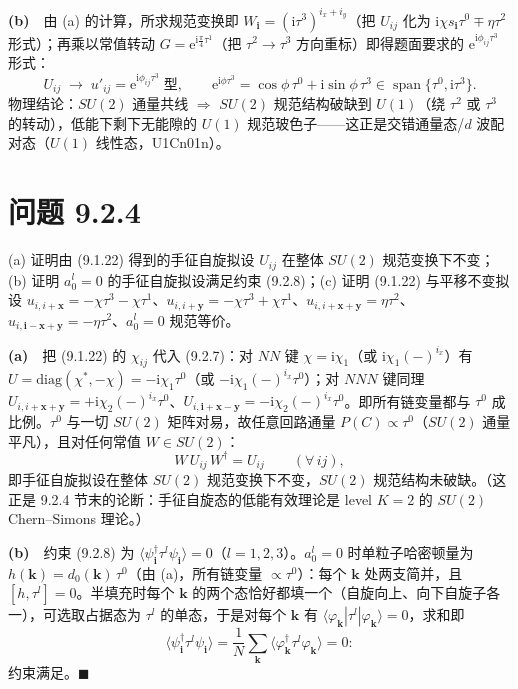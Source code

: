 \textbf{(b)}　由 (a) 的计算，所求规范变换即 $W_{\pmb{i}}=(\mathrm{i}\tau^3)^{i_x+i_y}$（把 $U_{ij}$ 化为 $\mathrm{i}\chi s_{\pmb{i}}\tau^0\mp\eta\tau^2$ 形式）；再乘以常值转动 $G=\mathrm{e}^{\mathrm{i}\frac{\pi}{4}\tau^1}$（把 $\tau^2\to\tau^3$ 方向重标）即得题面要求的 $\mathrm{e}^{\mathrm{i}\phi_{ij}\tau^3}$ 形式：
\begin{equation*}
U_{ij}\;\longrightarrow\;u'_{ij}=\mathrm{e}^{\mathrm{i}\phi_{ij}\tau^3}\;\text{型},\qquad
\mathrm{e}^{\mathrm{i}\phi\tau^3}=\cos\phi\,\tau^0+\mathrm{i}\sin\phi\,\tau^3\in\operatorname{span}\{\tau^0,\mathrm{i}\tau^3\} .
\end{equation*}
物理结论：$SU(2)$ 通量共线 $\Rightarrow$ $SU(2)$ 规范结构破缺到 $U(1)$（绕 $\tau^2$ 或 $\tau^3$ 的转动），低能下剩下无能隙的 $U(1)$ 规范玻色子——这正是交错通量态/$d$ 波配对态（$U(1)$ 线性态，U1Cn01n）。

\section*{问题 9.2.4}
\begin{problem}
(a) 证明由 (9.1.22) 得到的手征自旋拟设 $U_{ij}$ 在整体 $SU(2)$ 规范变换下不变；(b) 证明 $a_0^l=0$ 的手征自旋拟设满足约束 (9.2.8)；(c) 证明 (9.1.22) 与平移不变拟设 $u_{i,i+\pmb{x}}=-\chi\tau^3-\chi\tau^1$、$u_{i,i+\pmb{y}}=-\chi\tau^3+\chi\tau^1$、$u_{i,i+\pmb{x}+\pmb{y}}=\eta\tau^2$、$u_{i,\pmb{i}-\pmb{x}+\pmb{y}}=-\eta\tau^2$、$a_0^l=0$ 规范等价。
\end{problem}
\solution
\textbf{(a)}　把 (9.1.22) 的 $\chi_{ij}$ 代入 (9.2.7)：对 $NN$ 键 $\chi=\mathrm{i}\chi_1$（或 $\mathrm{i}\chi_1(-)^{i_x}$）有 $U=\mathrm{diag}(\chi^*,-\chi)=-\mathrm{i}\chi_1\tau^0$（或 $-\mathrm{i}\chi_1(-)^{i_x}\tau^0$）；对 $NNN$ 键同理 $U_{i,i+\pmb{x}+\pmb{y}}=+\mathrm{i}\chi_2(-)^{i_x}\tau^0$、$U_{i,\pmb{i}+\pmb{x}-\pmb{y}}=-\mathrm{i}\chi_2(-)^{i_x}\tau^0$。即所有链变量都与 $\tau^0$ 成比例。$\tau^0$ 与一切 $SU(2)$ 矩阵对易，故任意回路通量 $P(C)\propto\tau^0$（$SU(2)$ 通量平凡），且对任何常值 $W\in SU(2)$：
\begin{equation*}
W\,U_{ij}\,W^{\dagger}=U_{ij}\qquad(\forall\,ij) ,
\end{equation*}
即手征自旋拟设在整体 $SU(2)$ 规范变换下不变，$SU(2)$ 规范结构未破缺。（这正是 9.2.4 节末的论断：手征自旋态的低能有效理论是 level $K=2$ 的 $SU(2)$ Chern--Simons 理论。）

\textbf{(b)}　约束 (9.2.8) 为 $\langle\psi^{\dagger}_{\pmb{i}}\tau^l\psi_{\pmb{i}}\rangle=0$（$l=1,2,3$）。$a_0^l=0$ 时单粒子哈密顿量为 $h(\pmb{k})=d_0(\pmb{k})\,\tau^0$（由 (a)，所有链变量 $\propto\tau^0$）：每个 $\pmb{k}$ 处两支简并，且 $[h,\tau^l]=0$。半填充时每个 $\pmb{k}$ 的两个态恰好都填一个（自旋向上、向下自旋子各一），可选取占据态为 $\tau^l$ 的单态，于是对每个 $\pmb{k}$ 有 $\langle\varphi_{\pmb{k}}|\tau^l|\varphi_{\pmb{k}}\rangle=0$，求和即
\begin{equation*}
\langle\psi^{\dagger}_{\pmb{i}}\tau^l\psi_{\pmb{i}}\rangle
=\frac{1}{N}\sum_{\pmb{k}}\langle\varphi^{\dagger}_{\pmb{k}}\tau^l\varphi_{\pmb{k}}\rangle=0 :
\end{equation*}
约束满足。$\blacksquare$

